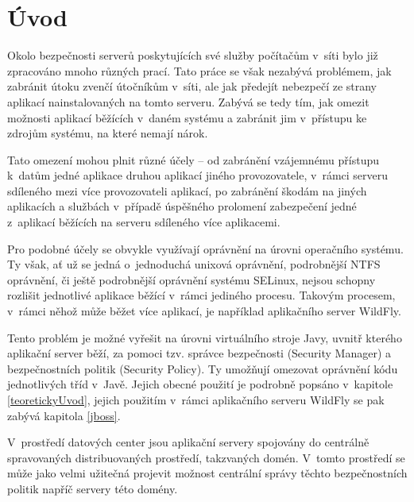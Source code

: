 
\chapter{Úvod} \label{uplnyUvod}

Okolo bezpečnosti serverů poskytujících své služby počítačům v~síti bylo již zpracováno mnoho různých prací.
Tato práce se však nezabývá problémem, jak zabránit útoku zvenčí útočníkům v~síti, ale jak předejít nebezpečí ze strany aplikací nainstalovaných na tomto serveru.
Zabývá se tedy tím, jak omezit možnosti aplikací běžících v~daném systému a zabránit jim v~přístupu ke zdrojům systému, na které nemají nárok.

Tato omezení mohou plnit různé účely -- od zabránění vzájemnému přístupu k~datům jedné aplikace druhou aplikací jiného provozovatele,
v~rámci serveru sdíleného mezi více provozovateli aplikací, po zabránění škodám na jiných aplikacích a službách v~případě úspěšného prolomení
zabezpečení jedné z~aplikací běžících na serveru sdíleného více aplikacemi.

Pro podobné účely se obvykle využívají oprávnění na úrovni operačního systému.
Ty však, ať už se jedná o~jednoduchá unixová oprávnění, podrobnější NTFS oprávnění, či ještě podrobnější oprávnění systému SELinux,
nejsou schopny rozlišit jednotlivé aplikace běžící v~rámci jediného procesu.
Takovým procesem, v~rámci něhož může běžet více aplikací, je například aplikačního server WildFly.

Tento problém je možné vyřešit na úrovni virtuálního stroje Javy, uvnitř kterého aplikační server běží, za pomoci tzv. správce bezpečnosti (Security Manager)
a bezpečnostních politik (Security Policy). Ty umožňují omezovat oprávnění kódu jednotlivých tříd v~Javě.
Jejich obecné použití je podrobně popsáno v~kapitole \ref{teoretickyUvod}, jejich použitím v~rámci aplikačního serveru WildFly se pak zabývá kapitola \ref{jboss}.

V~prostředí datových center jsou aplikační servery spojovány do centrálně spravovaných distribuovaných prostředí, takzvaných domén.
V~tomto prostředí se může jako velmi užitečná projevit možnost centrální správy těchto bezpečnostních politik napříč servery této domény.

